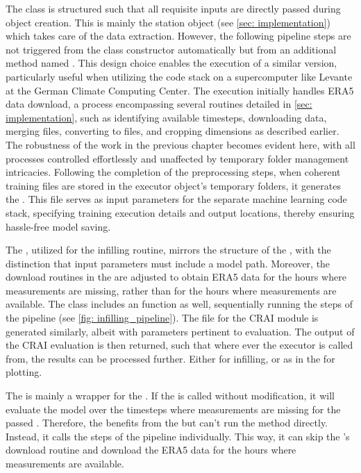 The  class is structured such that all requisite inputs are directly passed during object creation. This is mainly the station object (see \autoref{sec: implementation}) which takes care of the data extraction. 
However, the following pipeline steps are not triggered from the class constructor automatically but from an additional method named .
This design choice enables the execution of a similar  version, particularly useful when utilizing the code stack on a supercomputer like Levante at the German Climate Computing Center.
The execution initially handles ERA5 data download, a process encompassing several routines detailed in \autoref{sec: implementation}, such as identifying available timesteps, downloading data, merging  files, converting to  files, and cropping dimensions as described earlier.
The robustness of the work in the previous chapter becomes evident here, with all processes controlled effortlessly and unaffected by temporary folder management intricacies.
Following the completion of the preprocessing steps, when coherent training files are stored in the executor object's temporary folders, it generates the .
This file serves as input parameters for the separate machine learning code stack, specifying training execution details and output locations, thereby ensuring hassle-free model saving.

The , utilized for the infilling routine, mirrors the structure of the , with the distinction that input parameters must include a model path.
Moreover, the download routines in the  are adjusted to obtain ERA5 data for the hours where measurements are missing, rather than for the hours where measurements are available.
The class includes an  function as well, sequentially running the steps of the pipeline (see \autoref{fig: infilling_pipeline}).
The  file for the CRAI module is generated similarly, albeit with parameters pertinent to evaluation.
The output of the CRAI evaluation is then returned, such that where ever the executor is called from, the results can be processed further.
Either for infilling, or as in the  for plotting. 

The  is mainly a wrapper for the . If the  is called without modification, it will evaluate the model over the timesteps where measurements are missing for the passed . Therefore, the  benefits from the  but can't run the  method directly. Instead, it calls the steps of the pipeline individually. This way, it can skip the 's download routine and download the ERA5 data for the hours where measurements are available.

